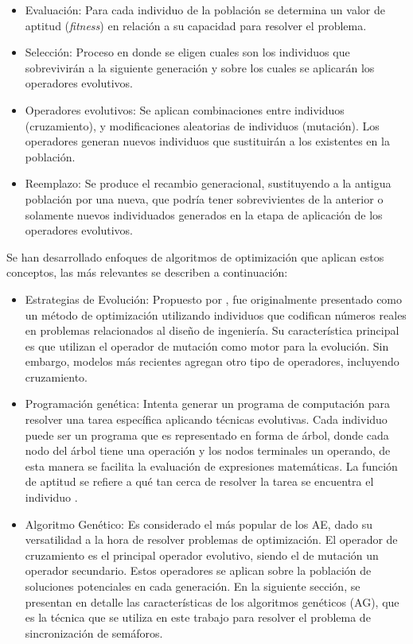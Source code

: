 \begin{itemize}
	\item Evaluación: Para cada individuo de la población se determina un valor de aptitud (\emph{fitness}) en relación a su capacidad para resolver el problema. 
	\item Selección: Proceso en donde se eligen cuales son los individuos que sobrevivirán a la siguiente generación y sobre los cuales se aplicarán los operadores evolutivos.
	\item Operadores evolutivos: Se aplican combinaciones entre individuos (cruzamiento), y modificaciones aleatorias de individuos (mutación). Los operadores generan nuevos individuos que sustituirán a los existentes en la población.
	\item Reemplazo: Se produce el recambio generacional, sustituyendo a la antigua población por una nueva, que podría tener sobrevivientes de la anterior o solamente nuevos individuados generados en la etapa de aplicación de los operadores evolutivos.
\end{itemize}

Se han desarrollado enfoques de algoritmos de optimización que aplican estos conceptos, las más relevantes se describen a continuación:

\begin{itemize}

	\item Estrategias de Evolución: Propuesto por \citet{Ingo1971}, fue originalmente presentado como un método de optimización utilizando individuos que codifican números reales en problemas relacionados al diseño de ingeniería. Su característica principal es que utilizan el operador de mutación como motor para la evolución. Sin embargo, modelos más recientes agregan otro tipo de operadores, incluyendo cruzamiento.
	\item Programación genética: Intenta generar un programa de computación para resolver una tarea específica aplicando técnicas evolutivas. Cada individuo puede ser un programa que es representado en forma de árbol, donde cada nodo del árbol tiene una operación y los nodos terminales un operando, de esta manera se facilita la evaluación de expresiones matemáticas. La función de aptitud se refiere a qué tan cerca de resolver la tarea se encuentra el individuo \citep{Koza1992}.
	\item Algoritmo Genético: Es considerado el más popular de los AE, dado su versatilidad a la hora de resolver problemas de optimización. El operador de cruzamiento es el principal operador evolutivo, siendo el de mutación un operador secundario. Estos operadores se aplican sobre la población de soluciones potenciales en cada generación. En la siguiente sección, se presentan en detalle las características de los algoritmos genéticos (AG), que es la técnica que se utiliza en este trabajo para resolver el problema de sincronización de semáforos.
	
\end{itemize}

